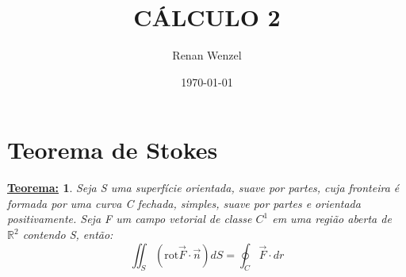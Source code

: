 \documentclass{article}
\title{C\'ALCULO 2}
\author{Renan Wenzel}
\date{\today}
\newtheorem*{tm*}{\underline{Teorema:}}
\begin{document}
\maketitle

\section{Teorema de Stokes}

 \begin{tm*}
  Seja S uma superf\'icie orientada, suave por partes, cuja fronteira \'e formada por uma curva
C fechada, simples, suave por partes e orientada positivamente. Seja F um campo vetorial de classe $C^1$ em uma
regi\~ao aberta de $\mathbb{R}^2$ contendo S, ent\~ao:
  $$\iint_{S}(\text{rot}\vec{F}\cdot{}\vec{n})dS = \oint_{C}\vec{F}\cdot{}dr $$ 
 \end{tm*}
\end{document}
